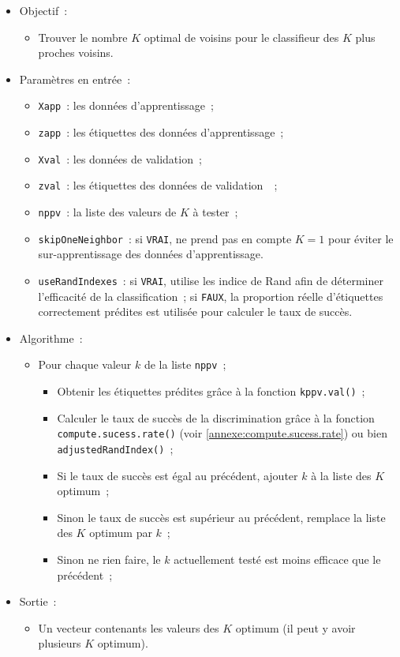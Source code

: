 \documentclass[a4paper,10pt]{report}
\begin{document}
\begin{itemize}
	\item Objectif~:
	\begin{itemize}
		\item Trouver le nombre $K$ optimal de voisins pour le classifieur des $K$ plus proches voisins.
	\end{itemize}
	
	\item Paramètres en entrée~:
	\begin{itemize}
		\item \texttt{Xapp}~: les données d'apprentissage~;
		\item \texttt{zapp}~: les étiquettes des données d'apprentissage~;
		\item \texttt{Xval}~: les données de validation~;
		\item \texttt{zval}~: les étiquettes des données de validation~~;
		\item \texttt{nppv}~: la liste des valeurs de $K$ à tester~;
		\item \texttt{skipOneNeighbor}~: si \texttt{VRAI}, ne prend pas en compte $K=1$ pour éviter le sur-apprentissage des données d'apprentissage.
		\item \texttt{useRandIndexes}~: si \texttt{VRAI}, utilise les indice de Rand afin de déterminer l'efficacité de la classification~; si \texttt{FAUX}, la proportion réelle d'étiquettes correctement prédites est utilisée pour calculer le taux de succès.
	\end{itemize}
	
	\item Algorithme~:
	\begin{itemize}
		\item Pour chaque valeur $k$ de la liste \texttt{nppv}~;
		\begin{itemize}
			\item Obtenir les étiquettes prédites grâce à la fonction \texttt{kppv.val()}~;
			\item Calculer le taux de succès de la discrimination grâce à la fonction \texttt{compute.sucess.rate()} (voir \autoref{annexe:compute.sucess.rate}) ou bien \texttt{adjustedRandIndex()}~;
			\item Si le taux de succès est égal au précédent, ajouter $k$ à la liste des $K$ optimum~;
			\item Sinon le taux de succès est supérieur au précédent, remplace la liste des $K$ optimum par $k$~;
			\item Sinon ne rien faire, le $k$ actuellement testé est moins efficace que le précédent~;
		\end{itemize}
	\end{itemize}
	
	\item Sortie~:
	\begin{itemize}
		\item Un vecteur contenants les valeurs des $K$ optimum (il peut y avoir plusieurs $K$ optimum).
	\end{itemize}
\end{itemize}
\end{document}
